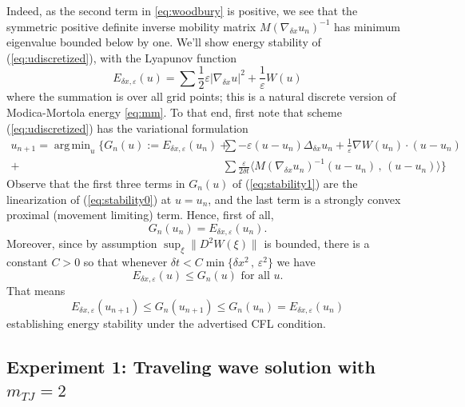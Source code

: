 \documentclass{article}
\theoremstyle{plain}
\theoremstyle{definition}
\theoremstyle{remark}
\newcommand{\eps}{\varepsilon}
\DeclareMathOperator*{\argmin}{arg\,min}
\begin{document}
Indeed, as the second term in \eqref{eq:woodbury} is positive, we see that the symmetric positive definite inverse mobility matrix $M(\nabla_{\delta x} u_n)^{-1}$ has minimum eigenvalue bounded below by one.
We'll show energy stability of (\ref{eq:udiscretized}), with the Lyapunov function
\begin{equation}
\label{eq:stability0}
E_{\delta x , \eps}(u) = \sum \frac{1}{2} \eps |\nabla_{\delta x} u|^2 + \frac{1}{\eps} W(u)
\end{equation}
where the summation is over all grid points;
this is a natural discrete version of Modica-Mortola energy \eqref{eq:mm}.
To that end, first note that scheme (\ref{eq:udiscretized}) has the variational formulation
\begin{equation}
\label{eq:stability1}
\begin{split}
u_{n+1} = \argmin_u \Big\{ G_n(u) := E_{\delta x,\eps}(u_n) + &\sum -\varepsilon(u-u_n)\Delta_{\delta x} u_n + \frac{1}{\eps} \nabla W(u_n) \cdot (u-u_n)\\
+&\sum\frac{\eps}{2\delta t} \langle M(\nabla_{\delta x}u_n)^{-1} (u-u_n) \, , \,  (u-u_n) \rangle \Big\}
\end{split}
\end{equation}
Observe that the first three terms in $G_n(u)$ of (\ref{eq:stability1}) are the linearization of (\ref{eq:stability0}) at $u=u_n$, and the last term is a strongly convex proximal (movement limiting) term.
Hence, first of all,
$$ G_n(u_n) = E_{\delta x,\eps}(u_n).$$
Moreover, since by assumption $\sup_\xi \| D^2W(\xi) \|$ is bounded, there is a constant $C>0$ so that whenever $\delta t < C \min\{ \delta x^2 \, , \, \eps^2 \}$ we have
$$ E_{\delta x, \eps} (u) \leq G_n(u) \mbox{ for all } u.$$
That means
$$ E_{\delta x,\eps}(u_{n+1}) \leq G_n(u_{n+1}) \leq G_n(u_n) = E_{\delta x,\eps} (u_n) $$
establishing energy stability under the advertised CFL condition.











\subsection{Experiment 1: Traveling wave solution with $m_{TJ} = 2$}
\end{document}
